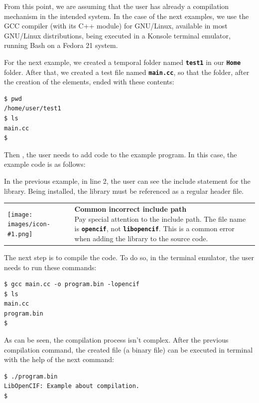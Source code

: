 \documentclass[11pt,twoside,openany,x11names,svgnames]{memoir}
\makeatletter
\newcommand{\IconNote}[3]
{
	\begin{table}[ht]
	\begin{tabular}{ lm{\dimexpr\textwidth-8\tabcolsep-\wd0}@{}}
		\toprule
		\texttt{[image: images/icon-\#1.png]}
		&
		\parbox[t]{155mm}{
		\textbf{#2} \\
		#3
		}
	\end{tabular}
\end{table}
}
\makeatother
\begin{document}
From this point, we are assuming that the user has already a compilation mechanism in the intended system. In the case of the next examples, we use the GCC compiler (with its C++ module) for GNU/Linux, available in most GNU/Linux distributions, being executed in a Konsole terminal emulator, running Bash on a Fedora 21 system.

For the next example, we created a temporal folder named \textbf{\texttt{test1}} in our  \textbf{\texttt{Home}} folder. After that, we created a test file named \textbf{\texttt{main.cc}}, so that the folder, after the creation of the elements, ended with these contents:

\begin{lstlisting}[frame=single,style=SystemCommandStyle]
$ pwd
/home/user/test1
$ ls
main.cc
$
\end{lstlisting}

Then , the user needs to add code to the example program. In this case, the example code is as follows:



In the previous example, in line 2, the user can see the include statement for the library. Being installed, the library must be referenced as a regular header file.

\IconNote
	{warning}
	{Common incorrect include path}
	{Pay special attention to the include path. The file name is \textbf{\texttt{opencif}}, not \textbf{\texttt{libopencif}}. This is a common error when adding the library to the source code.}
	
The next step is to compile the code. To do so, in the terminal emulator, the user needs to run these commands:

\begin{lstlisting}[frame=single,style=SystemCommandStyle]
$ gcc main.cc -o program.bin -lopencif
$ ls
main.cc
program.bin
$
\end{lstlisting}

As can be seen, the compilation process isn't complex. After the previous compilation command, the created file (a binary file) can be executed in terminal with the help of the next command:

\begin{lstlisting}[frame=single,style=SystemCommandStyle]
$ ./program.bin
LibOpenCIF: Example about compilation.
$
\end{lstlisting}
\end{document}
